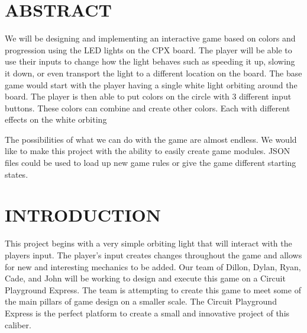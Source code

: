 \documentclass[12pt]{article}
\begin{document}
\tableofcontents
\pagebreak

\section{ABSTRACT}
We will be designing and implementing an interactive game based on colors and progression using the LED lights on the CPX board. The player will be able to use their inputs to change how the light behaves such as speeding it up, slowing it down, or even transport the light to a different location on the board. The base game would start with the player having a single white light orbiting around the board. The player is then able to put colors on the circle with 3 different input buttons. These colors can combine and create other colors. Each with different effects on the white orbiting 

The possibilities of what we can do with the game are almost endless. We would like to make this project with the ability to easily create game modules. JSON files could be used to load up new game rules or give the game different starting states.

\section{INTRODUCTION}
This project begins with a very simple orbiting light that will interact with the players input. The player's input creates changes throughout the game and allows for new and interesting mechanics to be added. Our team of Dillon, Dylan, Ryan, Cade, and John will be working to design and execute this game on a Circuit Playground Express. The team is attempting to create this game to meet some of the main pillars of game design on a smaller scale. The Circuit Playground Express is the perfect platform to create a small and innovative project of this caliber. 
\end{document}
